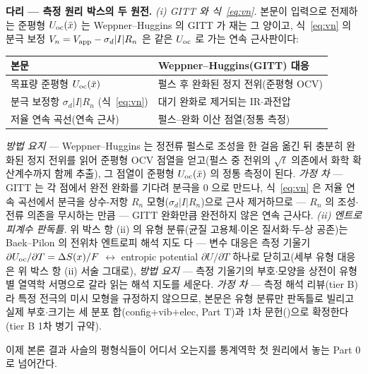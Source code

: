 \begin{srcbox}
\textbf{다리 --- 측정 원리 박스의 두 원전.} \emph{(i) GITT 와 식~\eqref{eq:vn}.} 본문이 입력으로 전제하는 준평형 $U_{\mathrm{oc}}(\bar x)$ 는
Weppner--Huggins 의 GITT\cite{weppner_huggins1977} 가 재는 그 양이고, 식~\eqref{eq:vn} 의 분극 보정
$V_n=V_{\mathrm{app}}-\sigma_d|I|R_n$ 은 같은 $U_{\mathrm{oc}}$ 로 가는 연속 근사판이다:
\begin{center}\footnotesize
\begin{tabular}{@{}ll@{}}
\hline
본문 & Weppner--Huggins\cite{weppner_huggins1977}(GITT) 대응 \\
\hline
목표량 준평형 $U_{\mathrm{oc}}(\bar x)$ & 펄스 후 완화된 정지 전위(준평형 OCV) \\
분극 보정항 $\sigma_d|I|R_n$ (식~\eqref{eq:vn}) & 대기 완화로 제거되는 IR$\cdot$과전압 \\
저율 연속 곡선(연속 근사) & 펄스--완화 이산 점열(정통 측정) \\
\hline
\end{tabular}
\end{center}
\emph{방법 요지} --- Weppner--Huggins 는 정전류 펄스로 조성을 한 걸음 옮긴 뒤 충분히 완화된 정지 전위를 읽어
준평형 OCV 점열을 얻고(펄스 중 전위의 $\sqrt t$ 의존에서 화학 확산계수까지 함께 추출), 그 점열이 준평형
$U_{\mathrm{oc}}(\bar x)$ 의 정통 측정이 된다. \emph{가정 차} --- GITT 는 각 점에서 완전 완화를 기다려 분극을 $0$ 으로
만드나, 식~\eqref{eq:vn} 은 저율 연속 곡선에서 분극을 상수-저항 $R_n$ 모형($\sigma_d|I|R_n$)으로 근사 제거하므로
--- $R_n$ 의 조성$\cdot$전류 의존을 무시하는 만큼 --- GITT 완화만큼 완전하지 않은 연속 근사다.
\emph{(ii) 엔트로피계수 판독틀.} 위 박스 항 (ii) 의 유형 분류(균질 고용체$\cdot$이온 질서화$\cdot$두-상 공존)는
Baek--Pilon 의 전위차 엔트로피 해석 지도\cite{baek_pilon2022} 다 --- 변수 대응은 측정 기울기
$\partial U_{\mathrm{oc}}/\partial T=\Delta S(x)/F$ $\leftrightarrow$ entropic potential $\partial U/\partial T$
하나로 닫히고(세부 유형 대응은 위 박스 항 (ii) 서술 그대로), \emph{방법 요지} --- 측정 기울기의 부호$\cdot$모양을
상전이 유형별 열역학 서명으로 갈라 읽는 해석 지도를 세운다. \emph{가정 차} --- 측정 해석 리뷰(tier B)라 특정
전극의 미시 모형을 규정하지 않으므로, 본문은 유형 분류만 판독틀로 빌리고 실제 부호$\cdot$크기는 세 분포
합(config$+$vib$+$elec, Part T)과 1차 문헌(\cite{reynier2003,allart2018})으로 확정한다(tier B 1차 병기 규약).
\end{srcbox}

이제 본론 결과 사슬의 평형식들이 어디서 오는지를 통계역학 첫 원리에서 놓는 Part 0 로 넘어간다.

